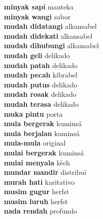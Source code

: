 \textbf{ minyak sapi  } manteka \\
\textbf{ minyak wangi  } sabor \\
\textbf{ mudah didatangi  } alkansabel \\
\textbf{ mudah didekati  } alkansabel \\
\textbf{ mudah dihubungi  } alkansabel \\
\textbf{ mudah geli  } delikado \\
\textbf{ mudah patah  } delikado \\
\textbf{ mudah pecah  } kibrabel \\
\textbf{ mudah putus  } delikado \\
\textbf{ mudah rosak  } delikado \\
\textbf{ mudah terasa  } delikado \\
\textbf{ muka pintu  } porta \\
\textbf{ mula bergerak  } kuminsá \\
\textbf{ mula berjalan  } kuminsá \\
\textbf{ mula-mula  } original \\
\textbf{ mulai bergerak  } kuminsá \\
\textbf{ mulai menyala  } kèch \\
\textbf{ mundar mandir  } distribuí \\
\textbf{ murah hati  } karitativo \\
\textbf{ musim gugur  } herfst \\
\textbf{ musim luruh  } herfst \\
\textbf{ nada rendah  } profundo \\
